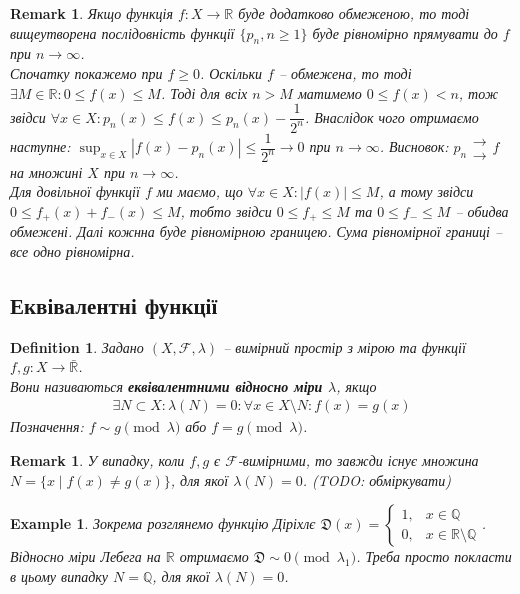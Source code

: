 \documentclass[a4paper, 10pt]{article}
\theoremstyle{theoremdd}
\newtheorem{definition}[theorem]{Definition}
\newtheorem{example}[theorem]{Example}
\newtheorem{remark}[theorem]{Remark}
\begin{document}
\begin{remark}
Якщо функція $f \colon X \to \mathbb{R}$ буде додатково обмеженою, то тоді вищеутворена послідовність функції $\{p_n, n \geq 1\}$ буде рівномірно прямувати до $f$ при $n \to \infty$.\\
Спочатку покажемо при $f \geq 0$. Оскільки $f$ -- обмежена, то тоді $\exists M \in \mathbb{R}: 0 \leq f(x) \leq M$. Тоді для всіх $n > M$ матимемо $0 \leq f(x) < n$, тож звідси $\forall x \in X: p_n(x) \leq f(x) \leq p_n(x) - \dfrac{1}{2^n}$. Внаслідок чого отримаємо наступне: $\displaystyle\sup_{x \in X} |f(x) - p_n(x)| \leq \dfrac{1}{2^n} \to 0$ при $n \to \infty$. Висновок: $p_n \substack{\rightarrow \\ \rightarrow} f$ на множині $X$ при $n \to \infty$.\\
Для довільної функції $f$ ми маємо, що $\forall x \in X: |f(x)| \leq M$, а тому звідси $0 \leq f_+(x) + f_-(x) \leq M$, тобто звідси $0 \leq f_+ \leq M$ та $0 \leq f_- \leq M$ -- обидва обмежені. Далі кожнна буде рівномірною границею. Сума рівномірної границі -- все одно рівномірна.
\end{remark}

\subsection{Еквівалентні функції}
\begin{definition}
Задано $(X,\mathcal{F},\lambda)$ -- вимірний простір з мірою та функції $f,g \colon X \to \bar{\mathbb{R}}$.\\
Вони називаються \textbf{еквівалентними відносно міри $\lambda$}, якщо
\begin{align*}
\exists N \subset X: \lambda(N) = 0: \forall x \in X \setminus N: f(x) = g(x)
\end{align*}
Позначення: $f \sim g \pmod \lambda$ або $f = g \pmod \lambda$.
\end{definition}

\begin{remark}
У випадку, коли $f,g$ є $\mathcal{F}$-вимірними, то завжди існує множина $N = \{x \mid f(x) \neq g(x)\}$, для якої $\lambda(N) = 0$. (\textit{TODO: обміркувати})
\end{remark}

\begin{example}
Зокрема розглянемо функцію Діріхлє $\mathfrak{D}(x) = \begin{cases} 1,& x \in \mathbb{Q} \\ 0, & x \in \mathbb{R} \setminus \mathbb{Q} \end{cases}$. Відносно міри Лебега на $\mathbb{R}$ отримаємо $\mathfrak{D} \sim 0 \pmod {\lambda_1}$. Треба просто покласти в цьому випадку $N = \mathbb{Q}$, для якої $\lambda(N) = 0$.
\end{example}
\end{document}
